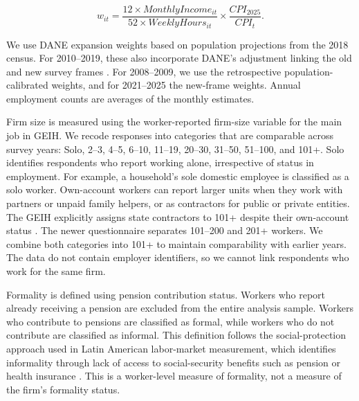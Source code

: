 \begin{equation}
  w_{it} =
  \frac{12 \times MonthlyIncome_{it}}{52 \times WeeklyHours_{it}}\times
  \frac{CPI_{2025}}{CPI_t}.    
\end{equation}

We use DANE expansion weights based on population projections from the 2018 census. For 2010--2019, these also incorporate DANE's adjustment linking the old and new survey frames \citep{DANE2022GEIHEmpalme}. For 2008--2009, we use the retrospective population-calibrated weights, and for 2021--2025 the new-frame weights. Annual employment counts are averages of the monthly estimates.

Firm size is measured using the worker-reported firm-size variable for the main job in GEIH. We recode responses into categories that are comparable across survey years: Solo, 2--3, 4--5, 6--10, 11--19, 20--30, 31--50, 51--100, and 101+. Solo identifies respondents who report working alone, irrespective of status in employment. For example, a household's sole domestic employee is classified as a solo worker. Own-account workers can report larger units when they work with partners or unpaid family helpers, or as contractors for public or private entities. The GEIH explicitly assigns state contractors to 101+ despite their own-account status \citep[pp.~89--90, 115]{DANE2025GEIHManual}. The newer questionnaire separates 101--200 and 201+ workers. We combine both categories into 101+ to maintain comparability with earlier years. The data do not contain employer identifiers, so we cannot link respondents who work for the same firm.


Formality is defined using pension contribution status. Workers who report already receiving a pension are excluded from the entire analysis sample. Workers who contribute to pensions are classified as formal, while workers who do not contribute are classified as informal. This definition follows the social-protection approach used in Latin American labor-market measurement, which identifies informality through lack of access to social-security benefits such as pension or health insurance \citep{WorldBankLACInformality2026}. This is a worker-level measure of formality, not a measure of the firm's formality status.


